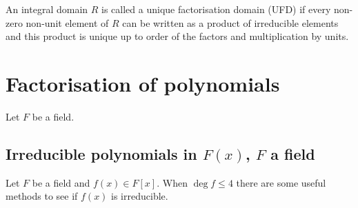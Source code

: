 \documentclass[10pt, a4paper]{article}
\begin{document}
\begin{definition}
    An integral domain $R$ is called a unique factorisation domain
    (UFD)
    if every non-zero non-unit element of $R$ can be written as a product of irreducible elements and this product is unique up to order of the factors and multiplication by units.
\end{definition}

\newpage

\section{Factorisation of polynomials}
Let $F$ be a field.

\subsection{Irreducible polynomials in \texorpdfstring{$F(x)$}{},
$F$ a field}
Let $F$ be a field and $f(x) \in F[x]$.
When $\deg{f} \leq 4$ there are some useful methods to see if $f(x)$ is irreducible.
\end{document}
